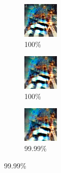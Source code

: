 \begin{enumerate}
\begin{figure}[!h]
\begin{subfigure}{.19\linewidth}
  \centering
  \includegraphics[width=0.7\linewidth]{imgs/robust_16/2_c}
  \caption{100\%}
\end{subfigure}
\begin{subfigure}{.19\linewidth}
  \centering
  \includegraphics[width=0.7\linewidth]{imgs/robust_16/3_r}
  \caption{100\%}
\end{subfigure}
\begin{subfigure}{.19\linewidth}
  \centering
  \includegraphics[width=0.7\linewidth]{imgs/robust_16/4_rr}
  \caption{99.99\%}
\end{subfigure}
\end{figure}


\end{enumerate}
